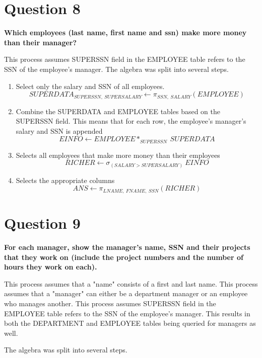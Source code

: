 \documentclass{article}
\begin{document}
\section{Question 8}

    \textbf{Which employees (last name, first name and ssn) make more money than their manager?}
    
    This process assumes SUPERSSN field in the EMPLOYEE table refers to the SSN of the employee's manager. The algebra was split into several steps.

    \begin{enumerate}
        \item Select only the salary and SSN of all employees.
        \[ SUPERDATA _{SUPERSSN, \: SUPERSALARY} \gets \pi _{SSN, \: SALARY} (EMPLOYEE) \]
        \item Combine the SUPERDATA and EMPLOYEE tables based on the SUPERSSN field. This means that for each row, the employee's manager's salary and SSN is appended
        \[ EINFO \gets EMPLOYEE * _{SUPERSSN} \: SUPERDATA \]
        \item Selects all employees that make more money than their employees
        \[ RICHER \gets \sigma _{(SALARY > SUPERSALARY)} \: EINFO\]
        \item Selects the appropriate columns
        \[ ANS \gets \pi _{LNAME, \: FNAME, \: SSN} (RICHER) \]
    \end{enumerate}

\section{Question 9}

    \textbf{For each manager, show the manager's name, SSN and their projects that they work on (include the project numbers and the number of hours they work on each).}
    
    This process assumes that a "name" consists of a first and last name. This process assumes that a "manager" can either be a department manager or an employee who manages another. This process assumes SUPERSSN field in the EMPLOYEE table refers to the SSN of the employee's manager. This results in both the DEPARTMENT and EMPLOYEE tables being queried for managers as well. 
    
    The algebra was split into several steps.
\end{document}
